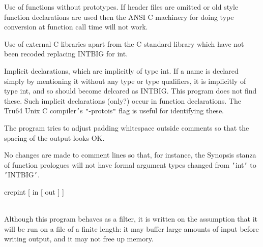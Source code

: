 \documentclass[twoside,11pt]{article}
\renewcommand{\_}{\texttt{\symbol{95}}}
\newcommand{\sstusage}[1]{\item[Usage:] \mbox{}
   \begin{description}
      {\ssttt \item #1}
   \end{description}
}
\newcommand{\sstnotes}[1]{\item[Notes:] \mbox{} \\[1.3ex] #1}
\newcommand{\sstitem}{\item}
\newcommand{\sstusage}[1]{\item[Usage:]
      \begin{description}
         {\ssttt #1}
      \end{description}
      \\
   }
\newcommand{\sstnotes}[1]{\item[Notes:] #1 }
\newcommand{\sstitem}{\item}
\begin{document}
{{{         \sstitem
            Use of functions without prototypes.  If header files are
              omitted or old style function declarations are used then the
              ANSI C machinery for doing type conversion at function call
              time will not work.

         \sstitem
            Use of external C libraries apart from the C standard library
              which have not been recoded replacing INT\_BIG for int.

         \sstitem
            Implicit declarations, which are implicitly of type int.
              If a name is declared simply by mentioning it without any type
              or type qualifiers, it is implicitly of type int, and so
              should become delcared as INT\_BIG.  This program does not
              find these.  Such implicit declarations (only?) occur in
              function declarations.  The Tru64 Unix C compiler{\tt '}s {\tt "}-protois{\tt "}
              flag is useful for identifying these.

      }
      The program tries to adjust padding whitespace outside comments
      so that the spacing of the output looks OK.

      No changes are made to comment lines so that, for instance, the
      Synopsis stanza of function prologues will not have formal argument
      types changed from {\tt '}int{\tt '} to {\tt '}INT\_BIG{\tt '}.
   }
   \sstusage{
      crepint [ in [ out ] ]
   }
   \sstnotes{
      Although this program behaves as a filter, it is written on
      the assumption that it will be run on a file of a finite length:
      it may buffer large amounts of input before writing output, and
      it may not free up memory.
   }
}

\end{document}

